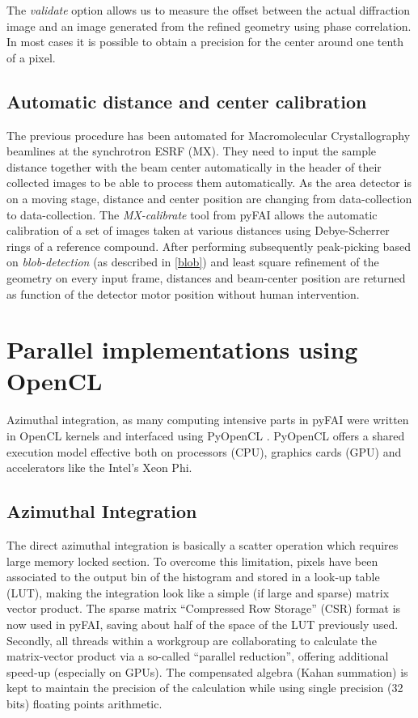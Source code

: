 \documentclass[preprint]{iucr}
\begin{document}
The \textit{validate} option allows us to measure the offset between the actual
diffraction image and an image generated from the refined geometry using phase
correlation. In most cases it is possible to obtain a precision for the
center around one tenth of a pixel.

\subsection{Automatic distance and center calibration}
The previous procedure has been automated for Macromolecular Crystallography
beamlines at the synchrotron ESRF (MX). They need to input the sample
distance together  with the beam center automatically in the header of their
collected images to be able to process them automatically.
As the area detector is on a moving stage, distance and center position are
changing from data-collection to data-collection.
The \textit{MX-calibrate} tool from pyFAI allows the automatic calibration of
a set of images taken at various distances using Debye-Scherrer rings of a
reference compound.
After performing subsequently peak-picking based on \textit{blob-detection}
(as described in \ref{blob}) and least square refinement of the geometry on
every input frame, distances and beam-center position are returned as function
of the detector motor position without human intervention.

\section{Parallel implementations using OpenCL}

Azimuthal integration, as  many computing intensive parts in pyFAI were written
in OpenCL kernels and interfaced using PyOpenCL \cite{pyopencl}. PyOpenCL offers a
shared execution model effective both on processors (CPU), graphics cards (GPU)
and accelerators like the Intel's Xeon Phi.

\subsection{Azimuthal Integration}
The direct azimuthal integration is basically a scatter operation which
requires large memory locked section.
To overcome this limitation, pixels have been
associated to the output bin of the histogram and stored in a look-up
table (LUT), making the integration look like a simple (if large and sparse)
matrix vector product.
The sparse matrix ``Compressed Row Storage'' (CSR) format is now used in pyFAI,
saving about half of the space of the LUT previously used.
Secondly, all threads within a workgroup are collaborating to calculate the
matrix-vector product via a so-called ``parallel reduction'', offering
additional speed-up (especially on GPUs).
The compensated algebra (Kahan summation) is kept to maintain the precision
of the calculation while using single precision (32 bits) floating points
arithmetic.
\end{document}
